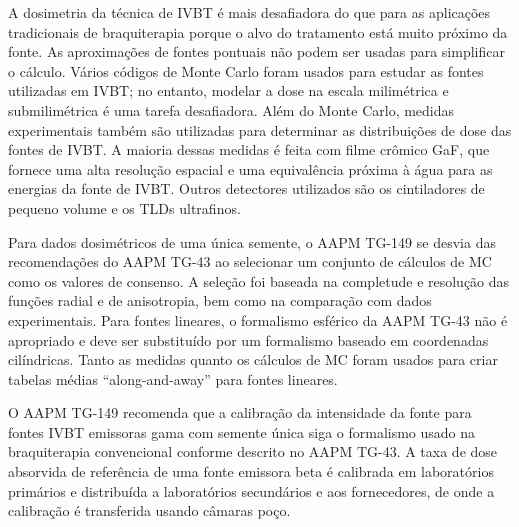 \documentclass[11pt,a4paper]{article}
\begin{document}
    A dosimetria da técnica de IVBT é mais desafiadora do que para as aplicações tradicionais de braquiterapia porque o alvo do tratamento está muito próximo da fonte. As aproximações de fontes pontuais não podem ser usadas para simplificar o cálculo. Vários códigos de Monte Carlo foram usados para estudar as fontes utilizadas em IVBT; no entanto, modelar a dose na escala milimétrica e submilimétrica é uma tarefa desafiadora. Além do Monte Carlo, medidas experimentais também são utilizadas para determinar as distribuições de dose das fontes de IVBT. A maioria dessas medidas é feita com filme crômico GaF, que fornece uma alta resolução espacial e uma equivalência próxima à água para as energias da fonte de IVBT. Outros detectores utilizados são os cintiladores de pequeno volume e os TLDs ultrafinos.

    Para dados dosimétricos de uma única semente, o AAPM TG-149 se desvia das recomendações do AAPM TG-43 ao selecionar um conjunto de cálculos de MC como os valores de consenso. A seleção foi baseada na completude e resolução das funções radial e de anisotropia, bem como na comparação com dados experimentais. Para fontes lineares, o formalismo esférico da AAPM TG-43 não é apropriado e deve ser substituído por um formalismo baseado em coordenadas cilíndricas. Tanto as medidas quanto os cálculos de MC foram usados para criar tabelas médias ``along-and-away'' para fontes lineares.

    O AAPM TG-149 recomenda que a calibração da intensidade da fonte para fontes IVBT emissoras gama com semente única siga o formalismo usado na braquiterapia convencional conforme descrito no AAPM TG-43. A taxa de dose absorvida de referência de uma fonte emissora beta é calibrada em laboratórios primários e distribuída a laboratórios secundários e aos fornecedores, de onde a calibração é transferida usando câmaras poço.


\end{document}
